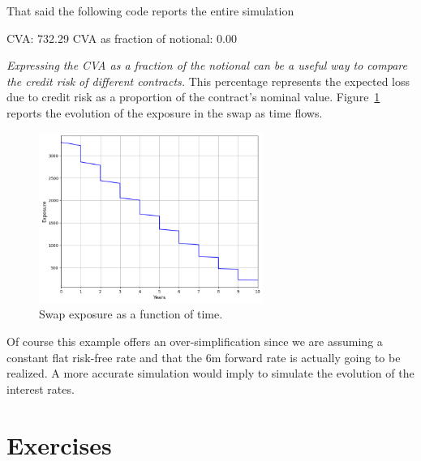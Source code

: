 That said the following code reports the entire simulation

\begin{ioutput}
CVA: 732.29
CVA as fraction of notional: 0.00
\end{ioutput}

\emph{Expressing the CVA as a fraction of the notional can be a useful way to compare the credit risk of different contracts.}
This percentage represents the expected loss due to credit risk as a proportion of the contract's nominal value.
Figure~\ref{fig:cva_exposure} reports the evolution of the exposure in the swap as time flows.

\begin{figure}[htb]
	\centering
 	\includegraphics[width=0.65\textwidth]{figures/cva_exposure}
 	\caption{Swap exposure as a function of time.}
 	\label{fig:cva_exposure}
\end{figure} 

Of course this example offers an over-simplification since we are assuming a constant flat risk-free rate and that the 6m forward rate is actually going to be realized. A more accurate simulation would imply to simulate the evolution of the interest rates.

\section*{Exercises}

